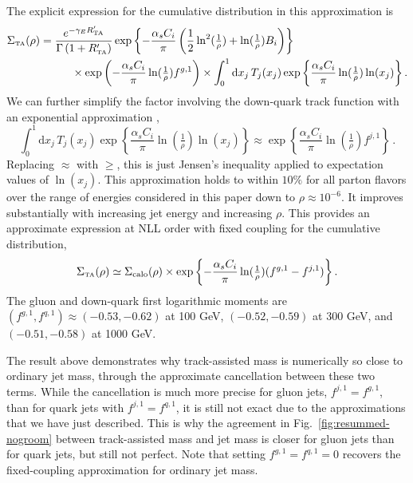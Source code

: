 \documentclass[letterpaper,11pt]{article}
\newcommand{\Fig}[1]{Fig.~\ref{#1}}
\begin{document}
The explicit expression for the cumulative distribution in this approximation is
\begin{align}
\begin{split}
\label{eq:approx-fixed-coupling-NLL-cumulative}
\Sigma_{\mbox{\tiny TA}}(\rho) &= \frac{e^{-\gamma_ER_{\mbox{\tiny TA}}'}}{\Gamma\left(1+R_{\mbox{\tiny TA}}'\right)} \exp\left\{-\frac{\alpha_sC_i}{\pi}\left(\frac{1}{2} \ln^2(\tfrac{1}{\rho})+\ln(\tfrac{1}{\rho})B_i\right)\right\}\\
&\hspace{1cm} \times \exp\left(-\frac{\alpha_s C_i}{\pi} \ln(\tfrac{1}{\rho}) f^{g,1}\right) \times \int_0^1 \text{d}x_j\, T_j(x_j)\exp\left\{\frac{\alpha_sC_i}{\pi}\ln(\tfrac{1}{\rho})\ln(x_j)\right\}.
\end{split}
\end{align}
We can further simplify the factor involving the down-quark track function with an exponential approximation \cite{Chang:2013iba},
\begin{equation}
\label{eq:exp-approx}
\int_0^1 \text{d}x_j\, T_j(x_j)\exp\left\{\frac{\alpha_sC_i}{\pi}\ln(\tfrac{1}{\rho})\ln(x_j)\right\} \approx \exp\left\{\frac{\alpha_sC_i}{\pi}\ln(\tfrac{1}{\rho}) f^{j,1}  \right\}\,.
\end{equation}
Replacing $\approx$ with $\geq$, this is just Jensen's inequality applied to expectation values of $\ln(x_j)$.
%
This approximation holds to within $10\%$ for all parton flavors over the range of energies considered in this paper down to $\rho \approx 10^{-6}$. 
%
It improves substantially with increasing jet energy and increasing $\rho$. 
%
This provides an approximate expression at NLL order with fixed coupling for the cumulative distribution,
\begin{align}\label{eq:cumulative-fixed}
\begin{split}
\Sigma_{\mbox{\tiny TA}}(\rho) \simeq \Sigma_{\rm calo}(\rho)\times \exp\left\{-\frac{\alpha_sC_i}{\pi}\ln(\tfrac{1}{\rho}) (f^{g,1}-f^{j,1})  \right\}.
\end{split}
\end{align}
The gluon and down-quark first logarithmic moments are $(f^{g,1},f^{q,1}) \approx (-0.53,-0.62)$ at 100 GeV, $(-0.52,-0.59)$ at 300 GeV, and $(-0.51,-0.58)$ at 1000 GeV. 

The result above demonstrates why track-assisted mass is numerically so close to ordinary jet mass, through the approximate cancellation between these two terms. 
%
While the cancellation is much more precise for gluon jets, $f^{j,1} = f^{g,1}$, than for quark jets with $f^{j,1} = f^{q,1}$, it is still not exact due to the approximations that we have just described. 
%
This is why the agreement in \Fig{fig:resummed-nogroom} between track-assisted mass and jet mass is closer for gluon jets than for quark jets, but still not perfect. 
%
Note that setting $f^{g,1} = f^{q,1} = 0$ recovers the fixed-coupling approximation for ordinary jet mass.
\end{document}

